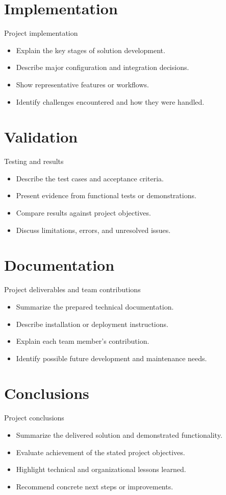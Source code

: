 \documentclass[aspectratio=169,xcolor=dvipsnames]{beamer}
\begin{document}
\section{Implementation}
\begin{frame}{Project implementation}
\begin{itemize}
\item Explain the key stages of solution development.
\item Describe major configuration and integration decisions.
\item Show representative features or workflows.
\item Identify challenges encountered and how they were handled.
\end{itemize}
\end{frame}
\section{Validation}
\begin{frame}{Testing and results}
\begin{itemize}
\item Describe the test cases and acceptance criteria.
\item Present evidence from functional tests or demonstrations.
\item Compare results against project objectives.
\item Discuss limitations, errors, and unresolved issues.
\end{itemize}
\end{frame}
\section{Documentation}
\begin{frame}{Project deliverables and team contributions}
\begin{itemize}
\item Summarize the prepared technical documentation.
\item Describe installation or deployment instructions.
\item Explain each team member's contribution.
\item Identify possible future development and maintenance needs.
\end{itemize}
\end{frame}
\section{Conclusions}
\begin{frame}{Project conclusions}
\begin{itemize}
\item Summarize the delivered solution and demonstrated functionality.
\item Evaluate achievement of the stated project objectives.
\item Highlight technical and organizational lessons learned.
\item Recommend concrete next steps or improvements.
\end{itemize}
\end{frame}
\end{document}
